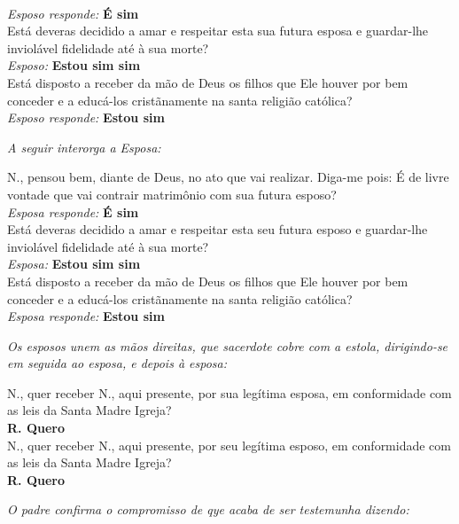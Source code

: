 \\ \textit{Esposo responde:} \textbf{É sim}
\vspace{3mm}
\\Está deveras decidido a amar e respeitar esta sua futura esposa e guardar-lhe inviolável fidelidade até à sua morte?
\\ \textit{Esposo:} \textbf{Estou sim sim}
\vspace{3mm}
\\Está disposto a receber da mão de Deus os filhos que Ele houver por bem conceder e a educá-los cristãnamente na santa religião católica?
\\ \textit{Esposo responde:} \textbf{Estou sim}
\\ \begin{center}
	\textit{A seguir interorga a Esposa:}
\end{center}
N., pensou bem, diante de Deus, no ato que vai realizar. Diga-me pois: É de livre vontade que vai contrair matrimônio com sua futura esposo?
\\ \textit{Esposa responde:} \textbf{É sim}
\vspace{3mm}
\\Está deveras decidido a amar e respeitar esta seu futura esposo e guardar-lhe inviolável fidelidade até à sua morte?
\\ \textit{Esposa:} \textbf{Estou sim sim}
\vspace{3mm}
\\Está disposto a receber da mão de Deus os filhos que Ele houver por bem conceder e a educá-los cristãnamente na santa religião católica?
\\ \textit{Esposa responde:} \textbf{Estou sim}

\begin{center}
	\textit{Os esposos unem as mãos direitas, que sacerdote cobre com a estola, dirigindo-se em seguida ao esposa, e depois à esposa:}
\end{center}

\noindent
 N., quer receber N., aqui presente, por sua legítima esposa, em conformidade com as leis da Santa Madre Igreja?
\\ \textbf{R. Quero}
\vspace{3mm}
\\N., quer receber N., aqui presente, por seu legítima esposo, em conformidade com as leis da Santa Madre Igreja?
\\ \textbf{R. Quero}
\vspace{3mm}
\begin{center}
	\textit{O padre confirma o compromisso de qye acaba de ser testemunha dizendo:}
\end{center}


